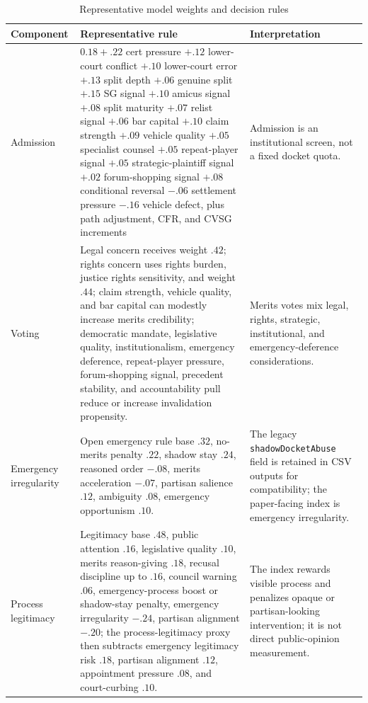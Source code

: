 \begin{table}[p]
\centering
\caption{Representative model weights and decision rules}
\label{tab:model-weights}
\scriptsize
\renewcommand{\arraystretch}{0.9}
\begin{tabular}{>{\raggedright\arraybackslash}p{1.10in}>{\raggedright\arraybackslash}p{2.65in}>{\raggedright\arraybackslash}p{2.05in}}
\toprule
Component & Representative rule & Interpretation \\
\midrule
Admission & $0.18 + .22$ cert pressure $+ .12$ lower-court conflict $+ .10$ lower-court error $+ .13$ split depth $+ .06$ genuine split $+ .15$ SG signal $+ .10$ amicus signal $+ .08$ split maturity $+ .07$ relist signal $+ .06$ bar capital $+ .10$ claim strength $+ .09$ vehicle quality $+ .05$ specialist counsel $+ .05$ repeat-player signal $+ .05$ strategic-plaintiff signal $+ .02$ forum-shopping signal $+ .08$ conditional reversal $-.06$ settlement pressure $-.16$ vehicle defect, plus path adjustment, CFR, and CVSG increments & Admission is an institutional screen, not a fixed docket quota. \\
Voting & Legal concern receives weight $.42$; rights concern uses rights burden, justice rights sensitivity, and weight $.44$; claim strength, vehicle quality, and bar capital can modestly increase merits credibility; democratic mandate, legislative quality, institutionalism, emergency deference, repeat-player pressure, forum-shopping signal, precedent stability, and accountability pull reduce or increase invalidation propensity. & Merits votes mix legal, rights, strategic, institutional, and emergency-deference considerations. \\
Emergency irregularity & Open emergency rule base $.32$, no-merits penalty $.22$, shadow stay $.24$, reasoned order $-.08$, merits acceleration $-.07$, partisan salience $.12$, ambiguity $.08$, emergency opportunism $.10$. & The legacy \texttt{shadowDocketAbuse} field is retained in CSV outputs for compatibility; the paper-facing index is emergency irregularity. \\
Process legitimacy & Legitimacy base $.48$, public attention $.16$, legislative quality $.10$, merits reason-giving $.18$, recusal discipline up to $.16$, council warning $.06$, emergency-process boost or shadow-stay penalty, emergency irregularity $-.24$, partisan alignment $-.20$; the process-legitimacy proxy then subtracts emergency legitimacy risk $.18$, partisan alignment $.12$, appointment pressure $.08$, and court-curbing $.10$. & The index rewards visible process and penalizes opaque or partisan-looking intervention; it is not direct public-opinion measurement. \\

\end{tabular}
\end{table}

